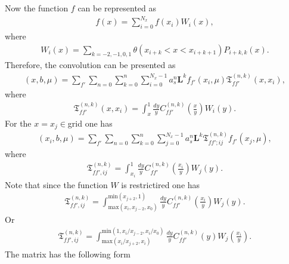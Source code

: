 \documentclass[prd,nofootinbib,eqsecnum,final]{revtex4}
\renewcommand{\(}{\left(}
\renewcommand{\)}{\right)}
\renewcommand{\[}{\left[}
\renewcommand{\]}{\right]}
\begin{document}
Now the function $f$ can be represented as
\begin{eqnarray}
f(x)=\sum_{i=0}^{N_x}f(x_i)W_i(x),
\end{eqnarray}
where 
\begin{eqnarray}
W_i(x)=\sum_{k=-2,-1,0,1}\theta(x_{i+k}<x<x_{i+k+1})P_{i+k,k}(x).
\end{eqnarray}
Therefore, the convolution can be presented as
\begin{eqnarray}
[C\otimes f](x,b,\mu)=\sum_{f'} \sum_{n=0}\sum_{k=0}^n \sum_{i=0}^{N_x-1} a_s^n \mathbf{L}^k f_{f'}(x_i,\mu) 
\mathfrak{T}_{ff'}^{(n,k)}(x,x_i),
\end{eqnarray}
where
\begin{eqnarray}
\mathfrak{T}_{ff'}^{(n,k)}(x,x_i)=\int_x^1 \frac{dy}{y}C^{(n,k)}_{ff'}\(\frac{x}{y}\)W_i(y).
\end{eqnarray}
For the $x=x_j \in $grid one has
\begin{eqnarray}
[C\otimes f](x_i,b,\mu)=\sum_{f'} \sum_{n=0}\sum_{k=0}^n \sum_{j=0}^{N_x-1} a_s^n \mathbf{L}^k  \mathfrak{T}_{ff';ij}^{(n,k)} f_{f'}(x_j,\mu) 
,
\end{eqnarray}
where
\begin{eqnarray}
\mathfrak{T}_{ff',ij}^{(n,k)}=\int_{x_i}^1 \frac{dy}{y}C^{(n,k)}_{ff'}\(\frac{x_i}{y}\)W_j(y).
\end{eqnarray}
Note that since the function $W$ is restrictired one has
\begin{eqnarray}
\mathfrak{T}_{ff',ij}^{(n,k)}=
\int_{\text{max}(x_i,x_{j-2},x_0)}^{\text{min}(x_{j+2},1)} \frac{dy}{y}C^{(n,k)}_{ff'}\(\frac{x_i}{y}\)W_j(y).
\end{eqnarray}
Or
\begin{eqnarray}
\mathfrak{T}_{ff',ij}^{(n,k)}=
\int^{\text{min}(1,x_i/x_{j-2},x_i/x_0)}_{\text{max}(x_i/x_{j+2},x_i)} \frac{dy}{y}C^{(n,k)}_{ff'}(y)W_j\(\frac{x_i}{y}\).
\end{eqnarray}
The matrix has the following form
\end{document}
